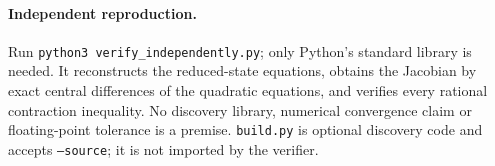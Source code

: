 \documentclass[11pt]{article}
\begin{document}
\paragraph{Independent reproduction.}
Run \texttt{python3 verify\_independently.py}; only Python's standard library is
needed. It reconstructs the reduced-state equations, obtains the Jacobian by
exact central differences of the quadratic equations, and verifies every
rational contraction inequality. No discovery library, numerical convergence
claim or floating-point tolerance is a premise. \texttt{build.py} is optional
discovery code and accepts \texttt{--source}; it is not imported by the verifier.
\end{document}
